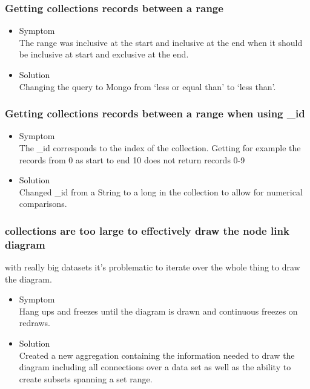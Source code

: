 \documentclass[oneside, english, final]{design}
\begin{document}
\subsubsection{Getting collections records between a range}



\begin{itemize}
      \item{Symptom
            \\
            The range was inclusive at the start and inclusive at the end when it should be inclusive at start and exclusive at the end.
	}
      \item{Solution
            \\
            Changing the query to Mongo from `less or equal than' to `less than'.
            }
\end{itemize}

\subsubsection{Getting collections records between a range when using \_id }

\begin{itemize}
      \item{Symptom
            \\
            The \_id corresponds to the index of the collection. Getting for example the records from 0 as start to end 10 does not return records 0-9
	}
      \item{Solution
            \\
            Changed \_id from a String to a long in the collection to allow for numerical comparisons.
            }
\end{itemize}



\subsubsection{collections are too large to effectively draw the node link diagram}

with really big datasets it's problematic to iterate over the whole thing to draw the diagram.

\begin{itemize}
      \item{Symptom
            \\
            Hang ups and freezes until the diagram is drawn and continuous freezes on redraws.
	}
      \item{Solution
            \\
            Created a new aggregation containing the information needed to draw the diagram including all connections over a data set as well as the ability to create subsets spanning a set range.
            }
\end{itemize}
\end{document}
